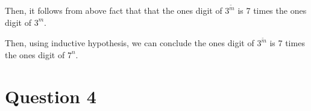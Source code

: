 \documentclass[12pt]{article}
\begin{document}
\begin{itemize}
\begin{mdframed}
\begin{enumerate}[1.]
\begin{mdframed}
            \bigskip

            Then, it follows from above fact that that the ones digit of $3^{\tilde{m}}$
            is 7 times the ones digit of $3^m$.

            \bigskip

            Then, using inductive hypothesis, we can conclude the ones digit of $3^{\tilde{m}}$
            is 7 times the ones digit of $7^n$.

            \end{mdframed}
        \end{enumerate}

    \end{mdframed}
\end{itemize}

\section*{Question 4}
\end{document}
